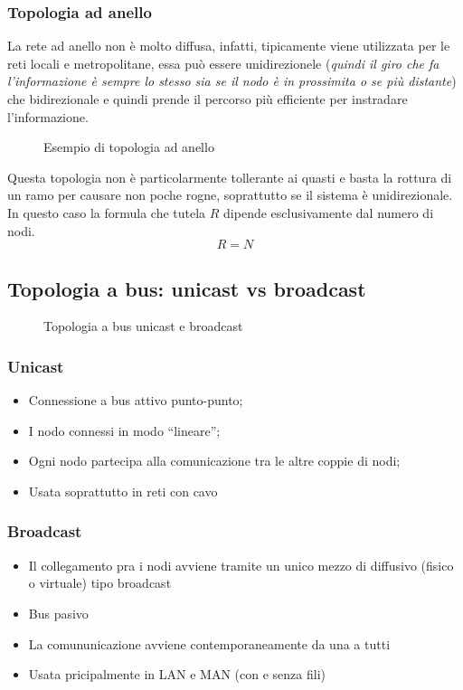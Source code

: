 \subsubsection{Topologia ad anello}
\label{sec:topadan}
La rete ad anello non è molto diffusa, infatti, tipicamente viene utilizzata per
le reti locali e metropolitane, essa può essere unidirezionele ({\it quindi il giro che
  fa l'informazione è sempre lo stesso sia se il nodo è in prossimita o se più
  distante}) che bidirezionale e quindi prende il percorso più efficiente per instradare
l'informazione.
\begin{figure}[ht]
  \centering
  
  \caption{Esempio di topologia ad anello}
  \label{fig:topologiaadanello}
\end{figure}
Questa topologia non è particolarmente tollerante ai quasti e basta la rottura di un
ramo per causare non poche rogne, soprattutto se il sistema è unidirezionale. In questo caso
la formula che tutela $R$ dipende esclusivamente dal numero di nodi.
\begin{equation}
  \label{eq:adanallo}
  R=N
\end{equation}

\subsection{Topologia a bus: unicast vs broadcast}
\label{sec:unicvsbroadcast}
\begin{figure}[ht]
  \centering
  
  \caption{Topologia a bus unicast e broadcast}
  \label{fig:topologiaadanello}
\end{figure}

\subsubsection{Unicast}
\label{sec:unicast}

\begin{itemize}
\item Connessione a bus attivo punto-punto;
\item I nodo connessi in modo ``lineare'';
\item Ogni nodo partecipa alla comunicazione tra le altre coppie di nodi;
\item Usata soprattutto in reti con cavo
\end{itemize}

\subsubsection{Broadcast}
\label{sec:broadcast}
\begin{itemize}
\item Il collegamento pra i nodi avviene tramite un unico mezzo di diffusivo (fisico o virtuale) tipo broadcast
\item Bus pasivo
\item La comununicazione avviene contemporaneamente da una a tutti
\item Usata pricipalmente in LAN e MAN (con e senza fili)
\end{itemize}


